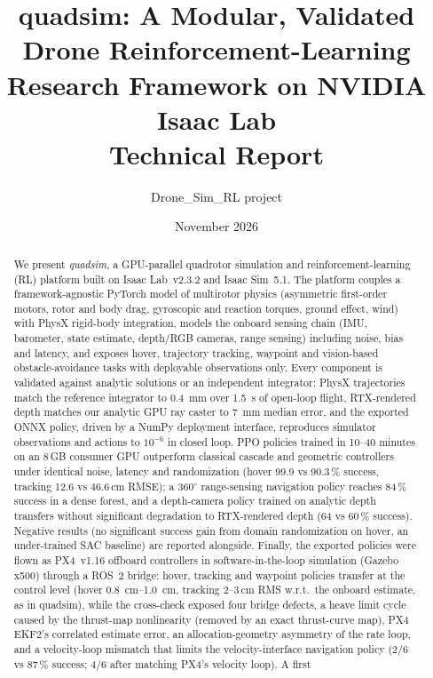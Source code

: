\documentclass[11pt,a4paper]{article}
\title{\textbf{quadsim}: A Modular, Validated Drone Reinforcement-Learning Research Framework on NVIDIA Isaac Lab\\[4pt]
\large Technical Report}
\author{Drone\_Sim\_RL project}
\date{November 2026}
\begin{document}
\maketitle

\begin{abstract}
We present \emph{quadsim}, a GPU-parallel quadrotor simulation and reinforcement-learning (RL) platform built on
Isaac Lab~v2.3.2 and Isaac Sim~5.1. The platform couples a framework-agnostic PyTorch model of multirotor
physics (asymmetric first-order motors, rotor and body drag, gyroscopic and reaction torques, ground effect,
wind) with PhysX rigid-body integration, models the onboard sensing chain (IMU, barometer, state estimate,
depth/RGB cameras, range sensing) including noise, bias and latency, and exposes hover, trajectory tracking,
waypoint and vision-based obstacle-avoidance tasks with deployable observations only. Every component is
validated against analytic solutions or an independent integrator: PhysX trajectories match the reference
integrator to \SI{0.4}{mm} over \SI{1.5}{s} of open-loop flight, RTX-rendered depth matches our analytic GPU ray
caster to \SI{7}{mm} median error, and the exported ONNX policy, driven by a NumPy deployment interface,
reproduces simulator observations and actions to $10^{-6}$ in closed loop. PPO policies trained in 10--40 minutes on an
8\,GB consumer GPU outperform classical cascade and geometric controllers under identical noise, latency and
randomization (hover 99.9 vs 90.3\,\% success, tracking 12.6 vs 46.6\,cm RMSE); a 360$^\circ$ range-sensing navigation
policy reaches 84\,\% success in a dense forest, and a depth-camera policy trained on analytic depth transfers
without significant degradation to RTX-rendered depth (64 vs 60\,\% success). Negative results (no significant success gain from
domain randomization on hover, an under-trained SAC baseline) are reported alongside. Finally, the exported
policies were flown as PX4~v1.16 offboard controllers in software-in-the-loop simulation (Gazebo x500) through a ROS~2
bridge: hover, tracking and waypoint policies transfer at the control level (hover \SIrange{0.8}{1.0}{cm}, tracking
2--3\,cm RMS w.r.t.\ the onboard estimate, as in quadsim), while the cross-check exposed four bridge defects, a heave
limit cycle caused by the thrust-map nonlinearity (removed by an exact thrust-curve map), PX4 EKF2's correlated
estimate error, an allocation-geometry asymmetry of the rate loop, and a velocity-loop mismatch that limits the
velocity-interface navigation policy (2/6 vs 87\,\% success; 4/6 after matching PX4's velocity loop). A first

\end{abstract}
\end{document}
